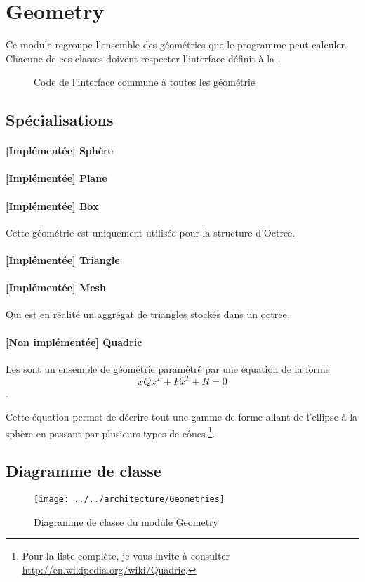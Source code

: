 \section{Geometry}
Ce module regroupe l'ensemble des géométries que le programme peut calculer.
Chacune de ces classes doivent respecter l'interface définit à la
.

\begin{figure}[h]
  \caption{Code de l'interface commune à toutes les
  géométrie \label{fig:IGeometry}}
\end{figure}

\subsection{Spécialisations}
\paragraph{[Implémentée] Sphère}
\paragraph{[Implémentée] Plane}
\paragraph{[Implémentée] Box} Cette géométrie est uniquement utilisée pour la
structure d'Octree.

\paragraph{[Implémentée] Triangle}

\paragraph{[Implémentée] Mesh} Qui est en réalité un aggrégat de triangles
stockés dans un octree.

\paragraph{[Non implémentée] Quadric} Les  sont un ensemble de
géométrie paramétré par une équation de la forme $$xQx^T + Px^T + R = 0$$. 

Cette équation permet de décrire tout une gamme de forme allant de l'ellipse à
la sphère en passant par plusieurs types de cônes.\footnote{Pour la liste
complète, je vous invite à consulter
\url{http://en.wikipedia.org/wiki/Quadric}.}.

\subsection{Diagramme de classe}
\begin{figure}[h]
\begin{center}
  \texttt{[image: ../../architecture/Geometries]}
  \caption{Diagramme de classe du module Geometry\label{fig:CDGeometry}}
\end{center}
\end{figure}
